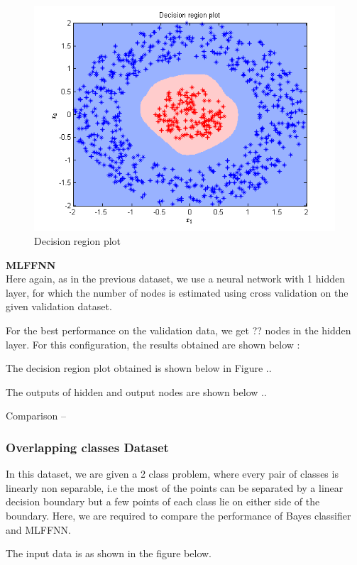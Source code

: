 \documentclass{article}
\begin{document}
\begin{figure}[H]
\centering
\includegraphics[width=\linewidth]{Classification/nonlinearlySeparable/decn_region_bayes.png}
\caption{Decision region plot}
\end{figure}



\begin{flushleft}
\textbf{MLFFNN} \\[10pt]
Here again, as in the previous dataset, we use a neural network with 1 hidden layer, for which the number of nodes is estimated using cross validation on the given validation dataset.

For the best performance on the validation data, we get ?? nodes in the hidden layer. For this configuration, the results obtained are shown below :

\end{flushleft}

\begin{flushleft}
The decision region plot obtained is shown below in Figure ..

The outputs of hidden and output nodes are shown below ..

\end{flushleft}


Comparison --



\subsubsection{Overlapping classes Dataset}
\begin{flushleft}
In this dataset, we are given a 2 class problem, where every pair of classes is linearly non separable, i.e the most of the points can be separated by a linear decision boundary but a few points of each class lie on either side of the boundary. Here, we are required to compare the performance of Bayes classifier and MLFFNN.

The input data is as shown in the figure below. \\[10pt]
\end{flushleft}
\end{document}
